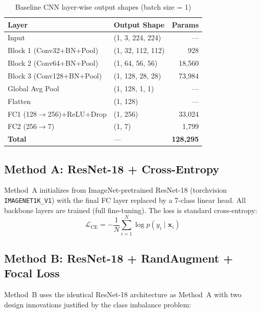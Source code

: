 \documentclass[conference]{IEEEtran}
\begin{document}
\begin{table}[ht]
\centering
\caption{Baseline CNN layer-wise output shapes (batch size = 1)}
\label{tab:baseline_shapes}
\begin{tabular}{llr}
\toprule
\textbf{Layer} & \textbf{Output Shape} & \textbf{Params} \\
\midrule
Input                         & (1, 3, 224, 224)  & —      \\
Block 1 (Conv32+BN+Pool)      & (1, 32, 112, 112) & 928    \\
Block 2 (Conv64+BN+Pool)      & (1, 64, 56, 56)   & 18,560 \\
Block 3 (Conv128+BN+Pool)     & (1, 128, 28, 28)  & 73,984 \\
Global Avg Pool               & (1, 128, 1, 1)    & —      \\
Flatten                       & (1, 128)           & —      \\
FC1 (128$\to$256)+ReLU+Drop   & (1, 256)           & 33,024 \\
FC2 (256$\to$7)               & (1, 7)             & 1,799  \\
\midrule
\textbf{Total}                & —          & \textbf{128,295} \\
\bottomrule
\end{tabular}
\end{table}

\subsection{Method A: ResNet-18 + Cross-Entropy}

Method~A initializes from ImageNet-pretrained ResNet-18
\cite{he2016deep} (torchvision \texttt{IMAGENET1K\_V1}) with the
final FC layer replaced by a 7-class linear head. All backbone
layers are trained (full fine-tuning). The loss is standard
cross-entropy:
\begin{equation}
\mathcal{L}_\text{CE} = -\frac{1}{N}\sum_{i=1}^{N} \log p(y_i \mid \mathbf{x}_i)
\end{equation}

\subsection{Method B: ResNet-18 + RandAugment + Focal Loss}

Method~B uses the identical ResNet-18 architecture as Method~A with
two design innovations justified by the class imbalance problem:
\end{document}

